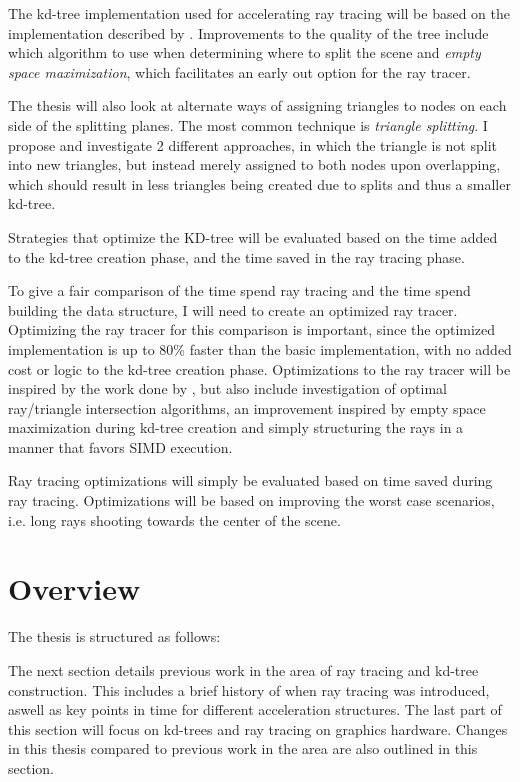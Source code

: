 The kd-tree implementation used for accelerating ray tracing will be
based on the implementation described by \zhou.  Improvements to the
quality of the tree include which algorithm to use when determining
where to split the scene and \textit{empty space maximization}, which
facilitates an early out option for the ray tracer.


The thesis will also look at alternate ways of assigning triangles to
nodes on each side of the splitting planes. The most common technique
is \textit{triangle splitting}. I propose and investigate 2 different
approaches, in which the triangle is not split into new triangles, but
instead merely assigned to both nodes upon overlapping, which should
result in less triangles being created due to splits and thus a
smaller kd-tree.

Strategies that optimize the KD-tree will be evaluated based on the
time added to the kd-tree creation phase, and the time saved in the
ray tracing phase.

To give a fair comparison of the time spend ray tracing and the time
spend building the data structure, I will need to create an optimized
ray tracer. Optimizing the ray tracer for this comparison is
important, since the optimized implementation is up to 80\% faster
than the basic implementation, with no added cost or logic to the
kd-tree creation phase. Optimizations to the ray tracer will be
inspired by the work done by \horn , but also include investigation of
optimal ray/triangle intersection algorithms, an improvement inspired
by empty space maximization during kd-tree creation and simply
structuring the rays in a manner that favors SIMD execution.

Ray tracing optimizations will simply be evaluated based on time saved
during ray tracing. Optimizations will be based on improving the
worst case scenarios, i.e. long rays shooting towards the center of
the scene.

\section{Overview}

The thesis is structured as follows:


The next section details previous work in the area of ray tracing and
kd-tree construction. This includes a brief history of when ray
tracing was introduced, aswell as key points in time for different
acceleration structures. The last part of this section will focus on
kd-trees and ray tracing on graphics hardware. Changes in this thesis
compared to previous work in the area are also outlined in this
section.

